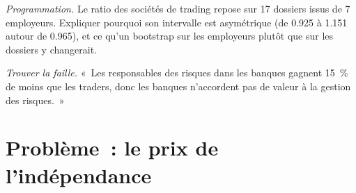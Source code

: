 \begin{exercise}[$\star\star\star$]\label{exo:in:risk-operations-product-control-and-compliance:7}
\emph{Programmation.} Le ratio des sociétés de trading repose sur 17 dossiers issus de 7 employeurs. Expliquer pourquoi son intervalle est asymétrique
(de 0.925 à 1.151 autour de 0.965), et ce qu'un bootstrap sur les employeurs plutôt que sur les dossiers y changerait.
\end{exercise}

\begin{exercise}[$\star\star\star$]\label{exo:in:risk-operations-product-control-and-compliance:8}
\emph{Trouver la faille.} «~Les responsables des risques dans les banques gagnent 15~\% de moins que les traders, donc les banques n'accordent pas
de valeur à la gestion des risques.~»
\end{exercise}

\section{Problème~: le prix de l'indépendance}

